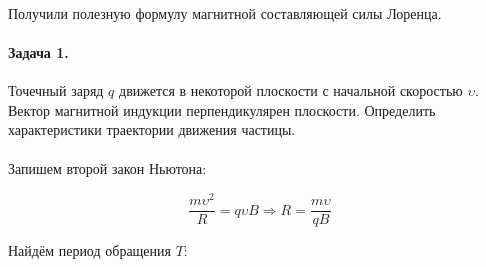 \documentclass[dvipdfmx]{article}
\begin{document}
\paragraph{}

Получили полезную формулу магнитной составляющей силы Лоренца.

\paragraph{Задача 1.}

Точечный заряд $q$ движется в некоторой плоскости с начальной скоростью $\upsilon$. Вектор магнитной
индукции перпендикулярен плоскости. Определить характеристики траектории движения частицы.

\paragraph{}

\noindent{}

Запишем второй закон Ньютона:

\begin{equation*}
  \frac{m\upsilon^2}{R} = q\upsilon B \Rightarrow R = \frac{m\upsilon}{qB}
\end{equation*}

Найдём период обращения $T$:
\end{document}
